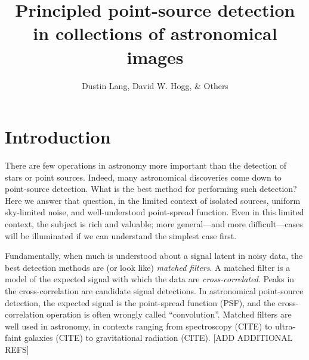 \documentclass[letterpaper,preprint]{aastex}
\newcounter{address}
\begin{document}
\title{Principled point-source detection in collections of astronomical images}
\author{%
  Dustin Lang,
  David W. Hogg,
  \& Others}

\begin{abstract}
\end{abstract}


\section{Introduction}

There are few operations in astronomy more important than the
detection of stars or point sources.
Indeed, many astronomical discoveries come down to point-source
detection.
What is the best method for performing such detection?
Here we answer that question, in the limited context of isolated
sources, uniform sky-limited noise, and well-understood point-spread
function.
Even in this limited context, the subject is rich and valuable; more
general---and more difficult---cases will be illuminated if we can
understand the simplest case first.

Fundamentally, when much is understood about a signal latent in noisy
data, the best detection methods are (or look like) \emph{matched
filters}.
A matched filter is a model of the expected signal with which the data
are \emph{cross-correlated}.%
Peaks in the cross-correlation are candidate signal detections.
In astronomical point-source detection, the expected signal is the
point-spread function (PSF), and the cross-correlation operation is often
wrongly called ``convolution''.
Matched filters are well used in astronomy, in contexts ranging from
spectroscopy (CITE) to ultra-faint galaxies (CITE) to gravitational
radiation (CITE).
[ADD ADDITIONAL REFS]
\end{document}

